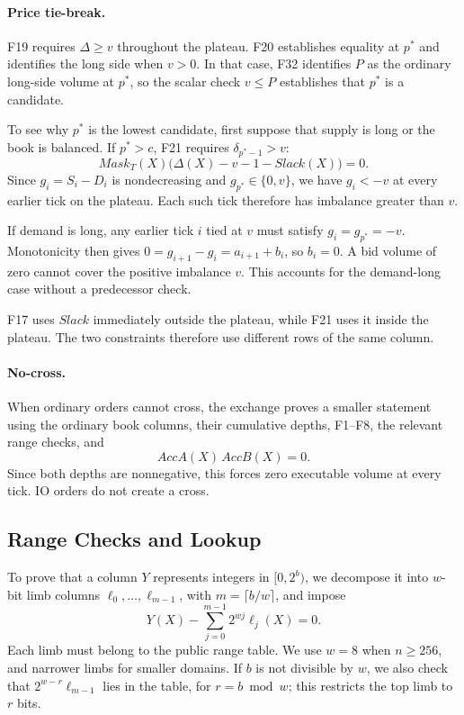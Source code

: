 \paragraph{Price tie-break.}
F19 requires \(\Delta\ge v\) throughout the plateau. F20 establishes equality at \(p^*\) and identifies the long side when \(v>0\). In that case, F32 identifies \(P\) as the ordinary long-side volume at \(p^*\), so the scalar check \(v\le P\) establishes that \(p^*\) is a candidate.

To see why \(p^*\) is the lowest candidate, first suppose that supply is long or the book is balanced. If \(p^*>c\), F21 requires
\(\delta_{p^*-1}>v\):
\[
Mask_T(X)\bigl(\Delta(X)-v-1-Slack(X)\bigr)=0.
\tag{F21}
\]
Since \(g_i=S_i-D_i\) is nondecreasing and \(g_{p^*}\in\{0,v\}\), we have \(g_i<-v\) at every earlier tick on the plateau. Each such tick therefore has imbalance greater than \(v\).

If demand is long, any earlier tick \(i\) tied at \(v\) must satisfy \(g_i=g_{p^*}=-v\). Monotonicity then gives \(0=g_{i+1}-g_i=a_{i+1}+b_i\), so \(b_i=0\). A bid volume of zero cannot cover the positive imbalance \(v\). This accounts for the
demand-long case without a predecessor check.

F17 uses \(Slack\) immediately outside the plateau, while F21 uses it inside the plateau. The two constraints therefore use different rows of the same column.

\paragraph{No-cross.} When ordinary orders cannot cross, the exchange proves a smaller statement using the ordinary book columns, their cumulative depths, F1--F8, the relevant range checks, and
\[
AccA(X)\,AccB(X)=0.
\]
Since both depths are nonnegative, this forces zero executable volume at every tick. IO orders do not create a cross.

\subsection{Range Checks and Lookup}

To prove that a column \(Y\) represents integers in \([0,2^b)\), we decompose it into \(w\)-bit limb columns \(\ell_0,\ldots,\ell_{m-1}\), with \(m=\lceil b/w\rceil\), and impose
\[
Y(X)-\sum_{j=0}^{m-1}2^{wj}\ell_j(X)=0.
\]
Each limb must belong to the public range table. We use \(w=8\) when \(n\ge256\), and narrower limbs for smaller domains. If \(b\) is not divisible by \(w\), we also check that \(2^{w-r}\ell_{m-1}\) lies in the table, for \(r=b\bmod w\); this restricts the top limb to \(r\) bits.

